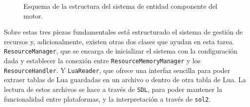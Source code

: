 \begin{figure}[t]
	\begin{center}
		\caption{Esquema de la estructura del sistema de entidad componente del motor.} 
		\label{fig:ec}
	\end{center}
\end{figure}

Sobre estas tres piezas fundamentales está estructurado el sistema de gestión de recursos y, adicionalmente, existen otras dos clases que ayudan en esta tarea. \texttt{ResourceManager}, que se encarga de inicializar el sistema con la configuración dada y establecer la conexión entre \texttt{ResourceMemoryManager} y los \texttt{ResourceHandler}. Y \texttt{LuaReader}, que ofrece una interfaz sencilla para poder extraer tablas de Lua guardadas en un archivo o dentro de otra tabla de Lua. La lectura de estos archivos se hace a través de \texttt{SDL}, para poder mantener la funcionalidad entre plataformas, y la interpretación a través de \texttt{sol2}.

